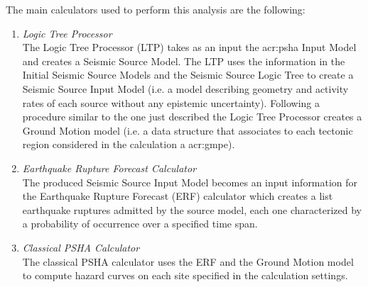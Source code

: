 The main calculators used to perform this analysis are the following:
\begin{enumerate}
\item \emph{Logic Tree Processor} \hfill \\
The Logic Tree Processor (LTP) takes as an input the \gls{acr:psha} 
Input Model and creates a Seismic Source Model. The LTP uses the 
information in the Initial Seismic Source Models and  
the Seismic Source Logic Tree to create a Seismic Source Input
Model (i.e. a model describing geometry and activity rates of each 
source without any epistemic uncertainty). 
%
Following a procedure similar to the one just described the Logic Tree 
Processor creates a Ground Motion model (i.e. a data structure that 
associates to each tectonic region considered in the calculation a 
\gls{acr:gmpe}).
%
\item \emph{Earthquake Rupture Forecast Calculator} \hfill \\
The produced Seismic Source Input Model becomes an input information for 
the Earthquake Rupture Forecast (ERF) calculator which creates a list 
earthquake ruptures admitted by the source model, each one characterized
by a probability of occurrence over a specified time span.
\item \emph{Classical PSHA Calculator} \hfill \\
The classical PSHA calculator uses the ERF and the Ground Motion model 
to compute hazard curves on each site specified in the calculation settings.
\end{enumerate} 
%
